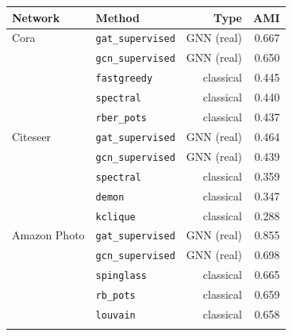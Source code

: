 \small
\begin{tabular}{llrr}
\toprule
\textbf{Network} & \textbf{Method} & \textbf{Type} & \textbf{AMI} \\
\midrule
Cora & \texttt{gat\_supervised} & GNN (real) & 0.667 \\
 & \texttt{gcn\_supervised} & GNN (real) & 0.650 \\
 & \texttt{fastgreedy} & classical & 0.445 \\
 & \texttt{spectral} & classical & 0.440 \\
 & \texttt{rber\_pots} & classical & 0.437 \\
\addlinespace[4pt]
Citeseer & \texttt{gat\_supervised} & GNN (real) & 0.464 \\
 & \texttt{gcn\_supervised} & GNN (real) & 0.439 \\
 & \texttt{spectral} & classical & 0.359 \\
 & \texttt{demon} & classical & 0.347 \\
 & \texttt{kclique} & classical & 0.288 \\
\addlinespace[4pt]
Amazon Photo & \texttt{gat\_supervised} & GNN (real) & 0.855 \\
 & \texttt{gcn\_supervised} & GNN (real) & 0.698 \\
 & \texttt{spinglass} & classical & 0.665 \\
 & \texttt{rb\_pots} & classical & 0.659 \\
 & \texttt{louvain} & classical & 0.658 \\
\addlinespace[4pt]
\bottomrule
\end{tabular}
\normalsize